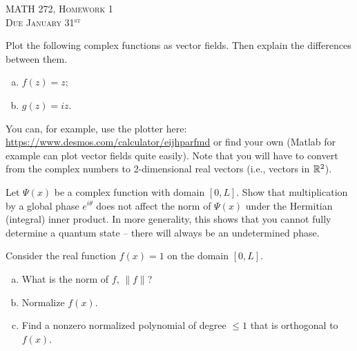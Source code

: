 \documentclass[12pt]{article} %
\begin{document}
\begin{center}
   \textsc{\large MATH 272, Homework 1}\\
   \textsc{Due January 31$^\textrm{st}$}
\end{center}
\vspace{.5cm}

\begin{problem}
	Plot the following complex functions as vector fields. Then explain the differences between them.
	\begin{enumerate}[(a)]
		\item $f(z) = z$;
		\item $g(z)=iz$.
	\end{enumerate}
You can, for example, use the plotter here: \url{https://www.desmos.com/calculator/eijhparfmd} or find your own (Matlab for example can plot vector fields quite easily). Note that you will have to convert from the complex numbers to 2-dimensional real vectors (i.e., vectors in $\mathbb{R}^2$).  
\end{problem}

\begin{problem}
	Let $\Psi(x)$ be a complex function with domain $[0,L]$.  Show that multiplication by a global phase $e^{i\theta}$ does not affect the norm of $\Psi(x)$ under the Hermitian (integral) inner product. In more generality, this shows that you cannot fully determine a quantum state -- there will always be an undetermined phase.
\end{problem}

\begin{problem}
	Consider the real function $f(x)=1$ on the domain $[0,L]$.
	\begin{enumerate}[(a)]
		\item What is the norm of $f$, $\|f\|$?
		\item Normalize $f(x)$.
		\item Find a nonzero normalized polynomial of degree $\leq 1$ that is orthogonal to $f(x)$.
	\end{enumerate}
\end{problem}
\end{document}

